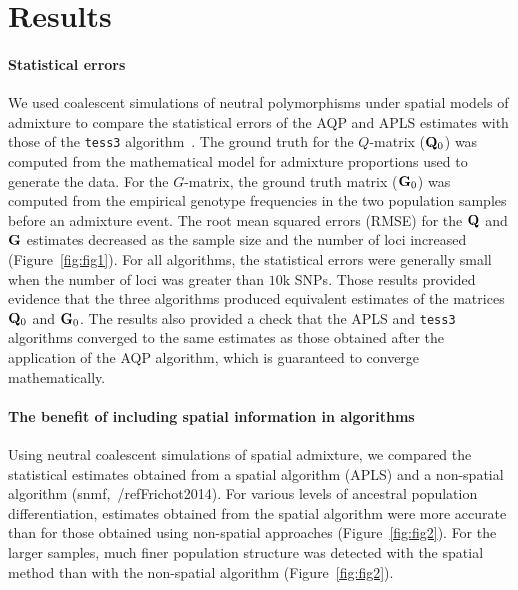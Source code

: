 \clearpage
\newpage


\section{Results}
\paragraph{Statistical errors} We used coalescent simulations of neutral
polymorphisms under spatial models of admixture to compare the statistical
errors of the AQP and APLS estimates with those of the {\tt tess3}
algorithm~\citep{Caye2016}. The ground truth for the $Q$-matrix (${\bf Q}_0$)
was computed from the mathematical model for admixture proportions used to
generate the data. For the $G$-matrix, the ground truth matrix (${\bf G}_0$) was
computed from the empirical genotype frequencies in the two population samples
before an admixture event. The root mean squared errors (RMSE) for the ${\bf Q}$
and ${\bf G}$ estimates decreased as the sample size and the number of loci
increased (Figure~\ref{fig:fig1}). For all algorithms, the statistical errors were generally
small when the number of loci was greater than $10$k SNPs. Those results
provided evidence that the three algorithms produced equivalent estimates of the
matrices ${\bf Q}_0$ and ${\bf G}_0$. The results also provided a check
that the APLS and {\tt tess3} algorithms converged to the same estimates as
those obtained after the application of the AQP algorithm, which is guaranteed
to converge mathematically.


\paragraph{The benefit of including spatial information in algorithms} Using
neutral coalescent simulations of spatial admixture, we compared the statistical
estimates obtained from a spatial algorithm (APLS) and a non-spatial algorithm
(snmf,~/ref{Frichot2014}). For various levels of ancestral population
differentiation, estimates obtained from the spatial algorithm were more
accurate than for those obtained using non-spatial approaches
(Figure~\ref{fig:fig2}). For the larger samples, much finer population structure
was detected with the spatial method than with the non-spatial algorithm
(Figure~\ref{fig:fig2}).

